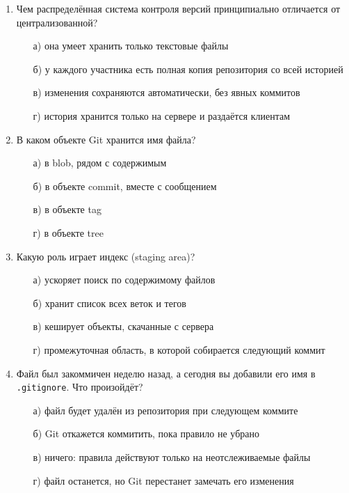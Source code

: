 \begin{enumerate}

\item Чем распределённая система контроля версий принципиально отличается от
      централизованной?
  \begin{enumerate}
    \item[а)] она умеет хранить только текстовые файлы
    \item[б)] у каждого участника есть полная копия репозитория со всей историей
    \item[в)] изменения сохраняются автоматически, без явных коммитов
    \item[г)] история хранится только на сервере и раздаётся клиентам
  \end{enumerate}

\item В каком объекте Git хранится имя файла?
  \begin{enumerate}
    \item[а)] в blob, рядом с содержимым
    \item[б)] в объекте commit, вместе с сообщением
    \item[в)] в объекте tag
    \item[г)] в объекте tree
  \end{enumerate}

\item Какую роль играет индекс (staging area)?
  \begin{enumerate}
    \item[а)] ускоряет поиск по содержимому файлов
    \item[б)] хранит список всех веток и тегов
    \item[в)] кеширует объекты, скачанные с сервера
    \item[г)] промежуточная область, в которой собирается следующий коммит
  \end{enumerate}

\item Файл был закоммичен неделю назад, а сегодня вы добавили его имя в
      \texttt{.gitignore}. Что произойдёт?
  \begin{enumerate}
    \item[а)] файл будет удалён из репозитория при следующем коммите
    \item[б)] Git откажется коммитить, пока правило не убрано
    \item[в)] ничего: правила действуют только на неотслеживаемые файлы
    \item[г)] файл останется, но Git перестанет замечать его изменения
  \end{enumerate}


\end{enumerate}
